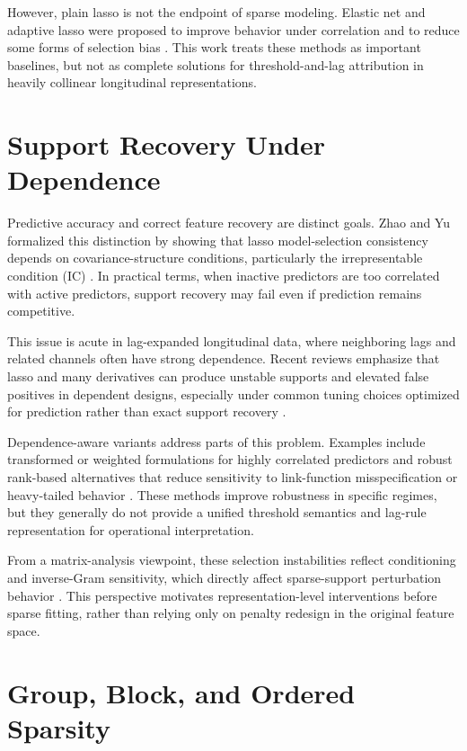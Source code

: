 However, plain lasso is not the endpoint of sparse modeling. Elastic net and adaptive lasso were proposed to improve behavior under correlation and to reduce some forms of selection bias \autocites{HZou2005Regularization,HZou2006adaptive}. This work treats these methods as important baselines, but not as complete solutions for threshold-and-lag attribution in heavily collinear longitudinal representations.

\section{Support Recovery Under Dependence}

Predictive accuracy and correct feature recovery are distinct goals. Zhao and Yu formalized this distinction by showing that lasso model-selection consistency depends on covariance-structure conditions, particularly the irrepresentable condition (IC) \autocite{PZhao2006model}. In practical terms, when inactive predictors are too correlated with active predictors, support recovery may fail even if prediction remains competitive.

This issue is acute in lag-expanded longitudinal data, where neighboring lags and related channels often have strong dependence. Recent reviews emphasize that lasso and many derivatives can produce unstable supports and elevated false positives in dependent designs, especially under common tuning choices optimized for prediction rather than exact support recovery \autocite{freijeirogonzalez2022}.

Dependence-aware variants address parts of this problem. Examples include transformed or weighted formulations for highly correlated predictors and robust rank-based alternatives that reduce sensitivity to link-function misspecification or heavy-tailed behavior \autocites{HZhu2021variable,MRejchel2020Rank}. These methods improve robustness in specific regimes, but they generally do not provide a unified threshold semantics and lag-rule representation for operational interpretation.

From a matrix-analysis viewpoint, these selection instabilities reflect conditioning and inverse-Gram sensitivity, which directly affect sparse-support perturbation behavior \autocite{RAHorn2012Matrix}. This perspective motivates representation-level interventions before sparse fitting, rather than relying only on penalty redesign in the original feature space.

\section{Group, Block, and Ordered Sparsity}

